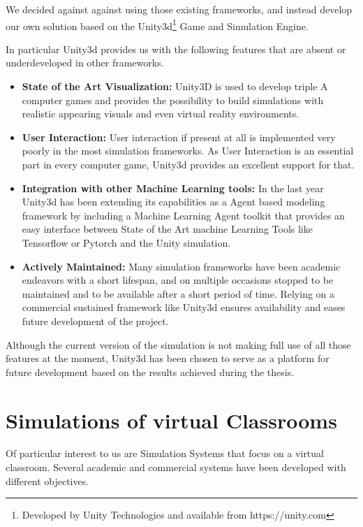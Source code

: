 \bb

We decided against against using those existing frameworks, and instead develop
our own solution based on the Unity3d\footnote{Developed by Unity Technologies and available from https://unity.com}
Game and Simulation Engine.

In particular Unity3d provides us with the following features that are absent
or underdeveloped in other frameworks.

\begin{itemize}
    \item \textbf{State of the Art Visualization:} Unity3D is used to develop triple
    A computer games and provides the possibility to build simulations with realistic
    appearing visuals and even virtual reality environments.
    \item \textbf{User Interaction:} User interaction if present at all is implemented
    very poorly in the most simulation frameworks. As User Interaction is an essential
    part in every computer game, Unity3d provides an excellent support for that.
    \item \textbf{Integration with other Machine Learning tools:} In the last year
    Unity3d has been extending its capabilities as a Agent based modeling framework
    by including a Machine Learning Agent toolkit that provides an easy
    interface between State of the Art machine Learning Tools like Tensorflow or Pytorch
    and the Unity simulation.
    \item \textbf{Actively Maintained:} Many simulation frameworks have been academic endeavors
    with a short lifespan, and on multiple occasions stopped to be maintained and
    to be available after a short period of time. Relying on a commercial sustained
    framework like Unity3d ensures availability and eases future development of
    the project.
\end{itemize}

Although the current version of the simulation is not making full use of all those
features at the moment, Unity3d has been chosen to serve as a platform for future
development based on the results achieved during the thesis.

\section{Simulations of virtual Classrooms}
Of particular interest to us are Simulation Systems that focus on a virtual classroom. 
Several academic and commercial systems have been developed with different objectives.

